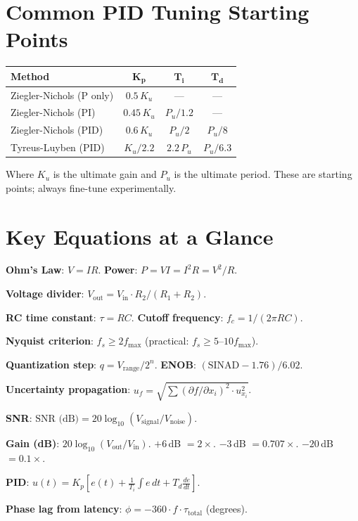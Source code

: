 \documentclass[11pt,letterpaper,twoside,openany]{book}
\begin{document}
\section*{Common PID Tuning Starting Points}
\begin{center}
\begin{tabular}{lccc}
\toprule
\textbf{Method} & $\boldsymbol{K_p}$ & $\boldsymbol{T_i}$ & $\boldsymbol{T_d}$ \\
\midrule
Ziegler-Nichols (P only) & $0.5\,K_u$ & --- & --- \\
Ziegler-Nichols (PI) & $0.45\,K_u$ & $P_u/1.2$ & --- \\
Ziegler-Nichols (PID) & $0.6\,K_u$ & $P_u/2$ & $P_u/8$ \\
Tyreus-Luyben (PID) & $K_u/2.2$ & $2.2\,P_u$ & $P_u/6.3$ \\
\bottomrule
\end{tabular}
\end{center}
Where $K_u$ is the ultimate gain and $P_u$ is the ultimate period. These are starting points; always fine-tune experimentally.

\section*{Key Equations at a Glance}

\textbf{Ohm's Law}: $V = IR$. \textbf{Power}: $P = VI = I^2R = V^2/R$.

\textbf{Voltage divider}: $V_{\text{out}} = V_{\text{in}} \cdot R_2/(R_1 + R_2)$.

\textbf{RC time constant}: $\tau = RC$. \textbf{Cutoff frequency}: $f_c = 1/(2\pi RC)$.

\textbf{Nyquist criterion}: $f_s \geq 2 f_{\max}$ (practical: $f_s \geq 5$--$10 f_{\max}$).

\textbf{Quantization step}: $q = V_{\text{range}} / 2^n$. \textbf{ENOB}: $(\text{SINAD} - 1.76)/6.02$.

\textbf{Uncertainty propagation}: $u_f = \sqrt{\sum (\partial f/\partial x_i)^2 \cdot u_{x_i}^2}$.

\textbf{SNR}: $\text{SNR (dB)} = 20\log_{10}(V_{\text{signal}}/V_{\text{noise}})$.

\textbf{Gain (dB)}: $20\log_{10}(V_{\text{out}}/V_{\text{in}})$. $+6$\,dB $= 2\times$. $-3$\,dB $= 0.707\times$. $-20$\,dB $= 0.1\times$.

\textbf{PID}: $u(t) = K_p\left[e(t) + \frac{1}{T_i}\int e\,dt + T_d\frac{de}{dt}\right]$.

\textbf{Phase lag from latency}: $\phi = -360 \cdot f \cdot \tau_{\text{total}}$ (degrees).
\end{document}
